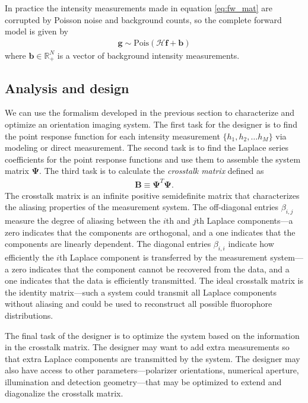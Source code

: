 \documentclass[10pt]{article}
\providecommand{\mb}[1]{\mathbf{#1}}
\providecommand{\mbb}[1]{\mathbb{#1}}
\begin{document}
In practice the intensity measurements made in equation \ref{eq:fw_mat} are
corrupted by Poisson noise and background counts, so the complete forward model is
given by
\begin{align}
  \mb{g} \sim \text{Pois}(\mathcal{H}\mb{f} + \mb{b})
\end{align}
where $\mb{b} \in \mbb{R}_+^N$ is a vector of background intensity
measurements.

\subsection{Analysis and design}
We can use the formalism developed in the previous section to characterize and
optimize an orientation imaging system. The first task for the designer is to
find the point response function for each intensity measurement
$\{h_1, h_2, \ldots h_M\}$ via modeling or direct measurement. The second task
is to find the Laplace series coefficients for the point response functions and
use them to assemble the system matrix $\mb{\Psi}$. The third task is to
calculate the \textit{crosstalk matrix} defined as
\begin{align}
  \mb{B} \equiv \mb{\Psi}^T\mb{\Psi}.
\end{align}
The crosstalk matrix is an infinite positive semidefinite matrix that
characterizes the aliasing properties of the measurement system. The
off-diagonal entries $\beta_{i,j}$ measure the degree of aliasing between the
$i$th and $j$th Laplace components---a zero indicates that the components are
orthogonal, and a one indicates that the components are linearly dependent. The
diagonal entries $\beta_{i,i}$ indicate how efficiently the $i$th Laplace
component is transferred by the measurement system---a zero indicates that the
component cannot be recovered from the data, and a one indicates that the data
is efficiently transmitted. The ideal crosstalk matrix is the identity
matrix---such a system could transmit all Laplace components without aliasing
and could be used to reconstruct all possible fluorophore distributions.

The final task of the designer is to optimize the system based on the
information in the crosstalk matrix. The designer may want to add extra
measurements so that extra Laplace components are transmitted by the system. The
designer may also have access to other parameters---polarizer orientations,
numerical aperture, illumination and detection geometry---that may be optimized
to extend and diagonalize the crosstalk matrix.
\end{document}
